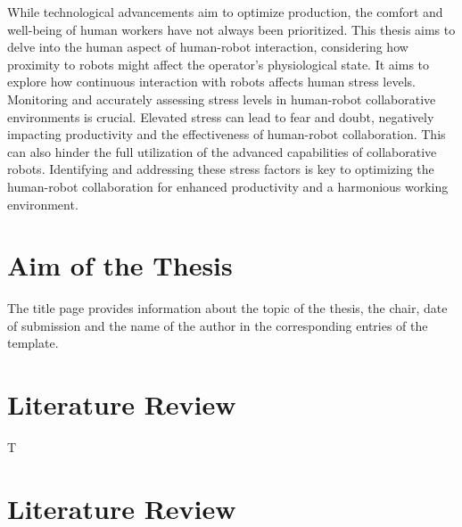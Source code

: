 While technological advancements aim to optimize production, the comfort and well-being of human workers have not always been prioritized. This thesis aims to delve into the human aspect of human-robot interaction, considering how proximity to robots might affect the operator's physiological state. It aims to explore how continuous interaction with robots affects human stress levels. Monitoring and accurately assessing stress levels in human-robot collaborative environments is crucial. Elevated stress can lead to fear and doubt, negatively impacting productivity and the effectiveness of human-robot collaboration. This can also hinder the full utilization of the advanced capabilities of collaborative robots. Identifying and addressing these stress factors is key to optimizing the human-robot collaboration for enhanced productivity and a harmonious working environment. 


\section{Aim of the Thesis}
The title page provides information about the topic of the thesis, the chair, date of submission and the name of the author in the corresponding entries of the template.

\section{Literature Review}
\label{hinweise:kurzfassung}

T
\section{Literature Review}
